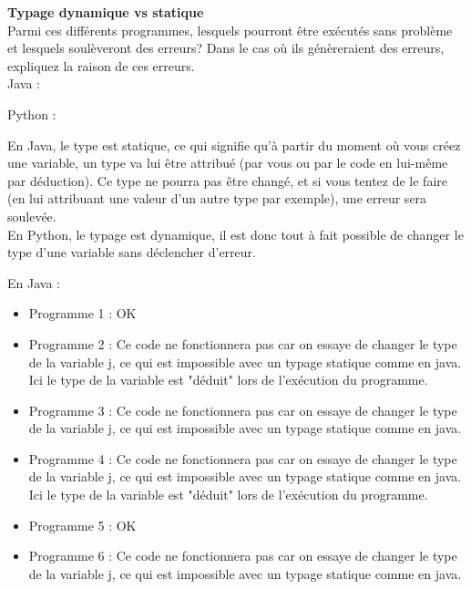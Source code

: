 \begin{Exercice}[15 minutes]  \textbf{Typage dynamique vs statique}\\
    
    Parmi ces différents programmes, lesquels pourront être exécutés sans problème et lesquels soulèveront des erreurs? Dans le cas où ils génèreraient des erreurs, expliquez la raison de ces erreurs.\\
    
    Java :
    
     
    
    Python :
    
     
    

    \begin{conseil}
    
        En Java, le type est statique, ce qui signifie qu'à partir du moment où vous créez une variable, un type va lui être attribué (par vous ou par le code en lui-même par déduction). Ce type ne pourra pas être changé, et si vous tentez de le faire (en lui attribuant une valeur d'un autre type par exemple), une erreur sera soulevée. \\

En Python, le typage est dynamique, il est donc tout à fait possible de changer le type d'une variable sans déclencher d'erreur. \\

    \end{conseil}
    \begin{solution}
        En Java : \\
        
        \begin{itemize}
        	\item Programme 1 : OK
        	\item Programme 2 : Ce code ne fonctionnera pas car on essaye de changer le type de la variable j, ce qui est impossible avec un typage statique comme en java. Ici le type de la variable est "déduit" lors de l'exécution du programme.
        	\item Programme 3 : Ce code ne fonctionnera pas car on essaye de changer le type de la variable j, ce qui est impossible avec un typage statique comme en java.
        	\item Programme 4 : Ce code ne fonctionnera pas car on essaye de changer le type de la variable j, ce qui est impossible avec un typage statique comme en java. Ici le type de la variable est "déduit" lors de l'exécution du programme.
        	\item Programme 5 : OK
        	\item Programme 6 : Ce code ne fonctionnera pas car on essaye de changer le type de la variable j, ce qui est impossible avec un typage statique comme en java. \\
        \end{itemize}
        

\end{solution}
\end{Exercice}
